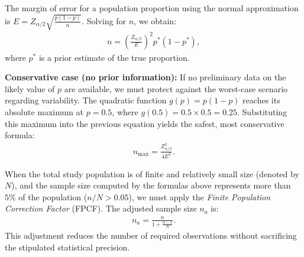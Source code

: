 \begin{teorema}
	The margin of error for a population proportion using the normal approximation is $E = Z_{\alpha/2} \sqrt{\frac{p(1-p)}{n}}$. Solving for $n$, we obtain:
	\begin{align}
		n = \left( \frac{Z_{\alpha/2}}{E} \right)^2 p^* (1 - p^*),
		\label{eq:n_proporcion}
	\end{align}
	where $p^*$ is a prior estimate of the true proportion.
	
	\textbf{Conservative case (no prior information):} If no preliminary data on the likely value of $p$ are available, we must protect against the worst-case scenario regarding variability. The quadratic function $g(p) = p(1-p)$ reaches its absolute maximum at $p = 0.5$, where $g(0.5) = 0.5 \times 0.5 = 0.25$. Substituting this maximum into the previous equation yields the safest, most conservative formula:
	\begin{align}
		n_{\text{max}} = \frac{Z_{\alpha/2}^2}{4 E^2}.
		\label{eq:n_conservador}
	\end{align}
\end{teorema}

\begin{observacion}
	When the total study population is of finite and relatively small size (denoted by $N$), and the sample size computed by the formulas above represents more than $5\%$ of the population ($n / N > 0.05$), we must apply the \emph{Finite Population Correction Factor} (FPCF). The adjusted sample size $n_a$ is:
	\begin{align}
		n_a = \frac{n}{1 + \frac{n-1}{N}}.
	\end{align}
	This adjustment reduces the number of required observations without sacrificing the stipulated statistical precision.
\end{observacion}
